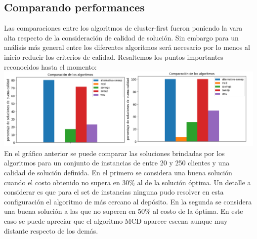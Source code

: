 \documentclass[11pt,a4paper]{article}
\begin{document}
\subsection{Comparando performances}
Las comparaciones entre los algoritmos de cluster-first fueron poniendo la vara alta respecto de la consideración de calidad de solución. Sin embargo para un análisis más general entre los diferentes algoritmos será necesario por lo menos al inicio reducir los criterios de calidad. Resaltemos los puntos importantes reconocidos hasta el momento: 
\\
\center
\includegraphics[scale=.6]{graf/comparativa_algoritmos.png}
En el gráfico anterior se puede comparar las soluciones brindadas por los algoritmos para un conjunto de instancias de entre 20 y 250 clientes y una calidad de solución definida. En el primero se considera una buena solución cuando el costo obtenido no supera en 30\% al de la solución óptima. Un detalle a considerar es que para el set de instancias ninguna pudo resolver en esta configuración el algoritmo de más cercano al depósito. En la segunda se considera una buena solución a las que no superen en 50\% al costo de la óptima. En este caso se puede apreciar que el algoritmo MCD aparece escena aunque muy distante respecto de los demás.
\end{document}
